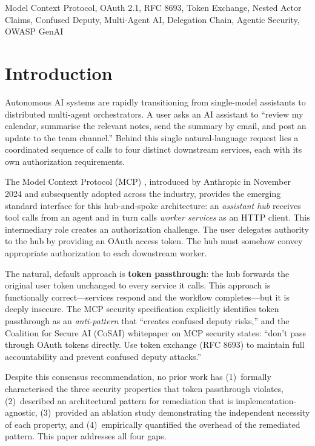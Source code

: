 \documentclass[journal]{IEEEtran}
\begin{document}
\begin{IEEEkeywords}
Model Context Protocol, OAuth 2.1, RFC 8693, Token Exchange, Nested Actor Claims,
Confused Deputy, Multi-Agent AI, Delegation Chain, Agentic Security, OWASP GenAI
\end{IEEEkeywords}

\section{Introduction}
\label{sec:introduction}

Autonomous AI systems are rapidly transitioning from single-model assistants to
distributed multi-agent orchestrators. A user asks an AI assistant to
``review my calendar, summarise the relevant notes, send the summary by email, and
post an update to the team channel.'' Behind this single natural-language request
lies a coordinated sequence of calls to four distinct downstream services, each
with its own authorization requirements.

The Model Context Protocol (MCP) \cite{mcp_spec}, introduced by Anthropic in
November 2024 and subsequently adopted across the industry, provides the emerging
standard interface for this hub-and-spoke architecture: an \textit{assistant hub}
receives tool calls from an agent and in turn calls \textit{worker services} as
an HTTP client. This intermediary role creates an authorization challenge. The
user delegates authority to the hub by providing an OAuth access token. The hub
must somehow convey appropriate authorization to each downstream worker.

The natural, default approach is \textbf{token passthrough}: the hub forwards the
original user token unchanged to every service it calls. This approach is
functionally correct---services respond and the workflow completes---but it is
deeply insecure. The MCP security specification \cite{mcp_security} explicitly
identifies token passthrough as an \textit{anti-pattern} that ``creates confused
deputy risks,'' and the Coalition for Secure AI (CoSAI) whitepaper on MCP
security \cite{cosai_mcp} states: ``don't pass through OAuth tokens directly.
Use token exchange (RFC 8693) to maintain full accountability and prevent confused
deputy attacks.''

Despite this consensus recommendation, no prior work has (1)~formally
characterised the three security properties that token passthrough violates,
(2)~described an architectural pattern for remediation that is
implementation-agnostic, (3)~provided an ablation study demonstrating the
independent necessity of each property, and (4)~empirically quantified the
overhead of the remediated pattern. This paper addresses all four gaps.
\end{document}
